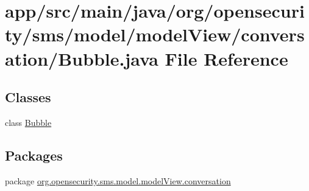 \hypertarget{a00021}{\section{app/src/main/java/org/opensecurity/sms/model/model\+View/conversation/\+Bubble.java File Reference}
\label{a00021}
}
\subsection*{Classes}
\begin{DoxyCompactItemize}
\item 
class \hyperlink{a00004}{Bubble}
\end{DoxyCompactItemize}
\subsection*{Packages}
\begin{DoxyCompactItemize}
\item 
package \hyperlink{a00038}{org.\+opensecurity.\+sms.\+model.\+model\+View.\+conversation}
\end{DoxyCompactItemize}
